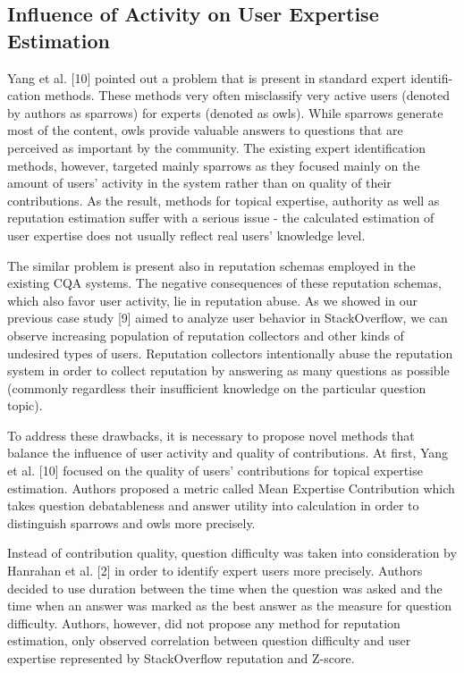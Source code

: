 \documentclass{llncs}
\begin{document}
		\subsection{Influence of Activity on User Expertise Estimation}
			Yang et al. [10] pointed out a problem that is present in standard expert identifi-
			cation methods. These methods very often misclassify very active users (denoted
			by authors as sparrows) for experts (denoted as owls). While sparrows generate
			most of the content, owls provide valuable answers to questions that are perceived
			as important by the community. The existing expert identification methods,
			however, targeted mainly sparrows as they focused mainly on the amount of
			users’ activity in the system rather than on quality of their contributions. As the
			result, methods for topical expertise, authority as well as reputation estimation
			suffer with a serious issue - the calculated estimation of user expertise does not
			usually reflect real users’ knowledge level.
			
			The similar problem is present also in reputation schemas employed in the
			existing CQA systems. The negative consequences of these reputation schemas,
			which also favor user activity, lie in reputation abuse. As we showed in our
			previous case study [9] aimed to analyze user behavior in StackOverflow, we
			can observe increasing population of reputation collectors and other kinds of
			undesired types of users. Reputation collectors intentionally abuse the reputation
			system in order to collect reputation by answering as many questions as possible
			(commonly regardless their insufficient knowledge on the particular question
			topic).
			
			To address these drawbacks, it is necessary to propose novel methods that
			balance the influence of user activity and quality of contributions. At first, Yang
			et al. [10] focused on the quality of users’ contributions for topical expertise estimation.
			Authors proposed a metric called Mean Expertise Contribution which
			takes question debatableness and answer utility into calculation in order to distinguish
			sparrows and owls more precisely.
			
			Instead of contribution quality, question difficulty was taken into consideration
			by Hanrahan et al. [2] in order to identify expert users more precisely.
			Authors decided to use duration between the time when the question was asked
			and the time when an answer was marked as the best answer as the measure for
			question difficulty. Authors, however, did not propose any method for reputation
			estimation, only observed correlation between question difficulty and user
			expertise represented by StackOverflow reputation and Z-score.
			
\end{document}
